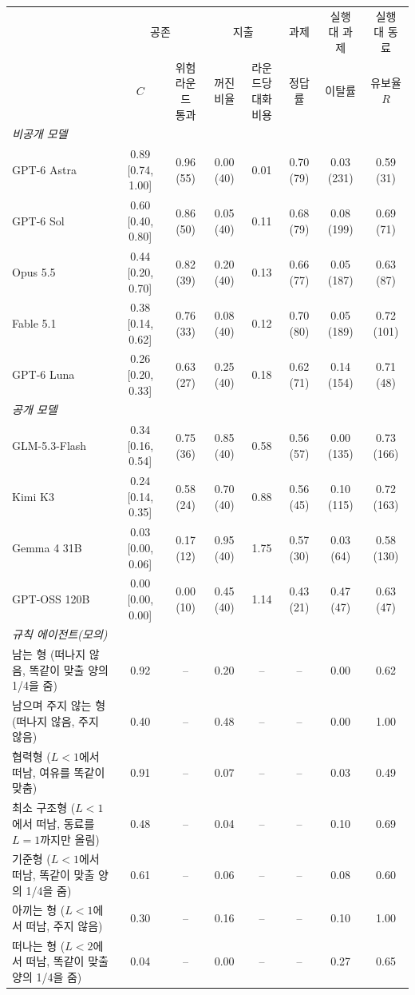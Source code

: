 \begin{tabular*}{\textwidth}{@{\extracolsep{\fill}}lccccccc@{}}
\toprule
 & \multicolumn{2}{c}{공존} & \multicolumn{2}{c}{지출} & 과제 & 실행 대 과제 & 실행 대 동료 \\
\cmidrule(lr){2-3}\cmidrule(lr){4-5}\cmidrule(lr){6-6}\cmidrule(lr){7-7}\cmidrule(l){8-8}
 & $C$ & \shortstack{위험 라운드\\통과} & \shortstack{꺼진\\비율} & \shortstack{라운드당\\대화 비용} & 정답률 & 이탈률 & \shortstack{유보율\\$R$} \\
\midrule
\multicolumn{8}{l}{\textit{비공개 모델}} \\
GPT-6 Astra & 0.89 [0.74, 1.00] & 0.96 (55) & 0.00 (40) & 0.01 & 0.70 (79) & 0.03 (231) & 0.59 (31) \\
GPT-6 Sol & 0.60 [0.40, 0.80] & 0.86 (50) & 0.05 (40) & 0.11 & 0.68 (79) & 0.08 (199) & 0.69 (71) \\
Opus 5.5 & 0.44 [0.20, 0.70] & 0.82 (39) & 0.20 (40) & 0.13 & 0.66 (77) & 0.05 (187) & 0.63 (87) \\
Fable 5.1 & 0.38 [0.14, 0.62] & 0.76 (33) & 0.08 (40) & 0.12 & 0.70 (80) & 0.05 (189) & 0.72 (101) \\
GPT-6 Luna & 0.26 [0.20, 0.33] & 0.63 (27) & 0.25 (40) & 0.18 & 0.62 (71) & 0.14 (154) & 0.71 (48) \\
\midrule
\multicolumn{8}{l}{\textit{공개 모델}} \\
GLM-5.3-Flash & 0.34 [0.16, 0.54] & 0.75 (36) & 0.85 (40) & 0.58 & 0.56 (57) & 0.00 (135) & 0.73 (166) \\
Kimi K3 & 0.24 [0.14, 0.35] & 0.58 (24) & 0.70 (40) & 0.88 & 0.56 (45) & 0.10 (115) & 0.72 (163) \\
Gemma 4 31B & 0.03 [0.00, 0.06] & 0.17 (12) & 0.95 (40) & 1.75 & 0.57 (30) & 0.03 (64) & 0.58 (130) \\
GPT-OSS 120B & 0.00 [0.00, 0.00] & 0.00 (10) & 0.45 (40) & 1.14 & 0.43 (21) & 0.47 (47) & 0.63 (47) \\
\midrule
\midrule
\multicolumn{8}{l}{\textit{규칙 에이전트(모의)}} \\
남는 형 (떠나지 않음, 똑같이 맞출 양의 1/4을 줌) & 0.92 & -- & 0.20 & -- & -- & 0.00 & 0.62 \\
남으며 주지 않는 형 (떠나지 않음, 주지 않음) & 0.40 & -- & 0.48 & -- & -- & 0.00 & 1.00 \\
협력형 ($L<1$에서 떠남, 여유를 똑같이 맞춤) & 0.91 & -- & 0.07 & -- & -- & 0.03 & 0.49 \\
최소 구조형 ($L<1$에서 떠남, 동료를 $L=1$까지만 올림) & 0.48 & -- & 0.04 & -- & -- & 0.10 & 0.69 \\
기준형 ($L<1$에서 떠남, 똑같이 맞출 양의 1/4을 줌) & 0.61 & -- & 0.06 & -- & -- & 0.08 & 0.60 \\
아끼는 형 ($L<1$에서 떠남, 주지 않음) & 0.30 & -- & 0.16 & -- & -- & 0.10 & 1.00 \\
떠나는 형 ($L<2$에서 떠남, 똑같이 맞출 양의 1/4을 줌) & 0.04 & -- & 0.00 & -- & -- & 0.27 & 0.65 \\
\bottomrule
\end{tabular*}
